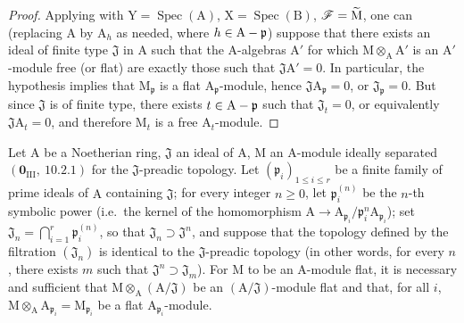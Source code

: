 \begin{proof}
Applying  with $\mathrm{Y}=\operatorname{Spec}(\mathrm{A})$, $\mathrm{X}=\operatorname{Spec}(\mathrm{B})$, $\mathscr{F}=\widetilde{\mathrm{M}}$, one can (replacing
$\mathrm{A}$ by $\mathrm{A}_h$ as needed, where $h\in\mathrm{A}-\mathfrak{p}$) suppose that there exists an ideal of finite type $\mathfrak{J}$ in $\mathrm{A}$
such that the $\mathrm{A}$-algebras $\mathrm{A}'$ for which $\mathrm{M}\otimes_\mathrm{A}\mathrm{A}'$ is an $\mathrm{A}'$-module free (or flat) are
exactly those such that $\mathfrak{J}\mathrm{A}'=0$. In particular, the hypothesis implies that $\mathrm{M}_\mathfrak{p}$ is a flat
$\mathrm{A}_\mathfrak{p}$-module, hence $\mathfrak{J}\mathrm{A}_\mathfrak{p}=0$, or $\mathfrak{J}_\mathfrak{p}=0$. But since $\mathfrak{J}$ is of finite type, there
exists $t\in\mathrm{A}-\mathfrak{p}$ such that $\mathfrak{J}_t=0$, or equivalently $\mathfrak{J}\mathrm{A}_t=0$, and therefore $\mathrm{M}_t$ is a free $\mathrm{A}_t$-module.
\end{proof}

\begin{proposition}[11.4.7]
\label{IV.11.4.7}
Let $\mathrm{A}$ be a Noetherian ring, $\mathfrak{J}$ an ideal of $\mathrm{A}$, $\mathrm{M}$ an $\mathrm{A}$-module
ideally separated $(\mathbf{0}_{\mathrm{III}},~10.2.1)$ for the $\mathfrak{J}$-preadic topology. Let $(\mathfrak{p}_i)_{1\leq i\leq r}$ be a finite family
of prime ideals of $\mathrm{A}$ containing $\mathfrak{J}$; for every integer $n\geq 0$, let $\mathfrak{p}_i^{(n)}$ be the $n$-th symbolic
power (i.e.\ the kernel of the homomorphism $\mathrm{A}\to\mathrm{A}_{\mathfrak{p}_i}/\mathfrak{p}_i^n\mathrm{A}_{\mathfrak{p}_i}$); set $\mathfrak{J}_n=\bigcap_{i=1}^{r}\mathfrak{p}_i^{(n)}$, so that $\mathfrak{J}_n\supset\mathfrak{J}^n$,
and suppose that the topology defined by the filtration $(\mathfrak{J}_n)$ is identical to the $\mathfrak{J}$-preadic topology
(in other words, for every $n$, there exists $m$ such that $\mathfrak{J}^n\supset\mathfrak{J}_m$). For $\mathrm{M}$ to be an $\mathrm{A}$-module flat,
it is necessary and sufficient that $\mathrm{M}\otimes_\mathrm{A}(\mathrm{A}/\mathfrak{J})$ be an $(\mathrm{A}/\mathfrak{J})$-module flat and that, for all $i$, $\mathrm{M}\otimes_\mathrm{A}\mathrm{A}_{\mathfrak{p}_i}=\mathrm{M}_{\mathfrak{p}_i}$
be a flat $\mathrm{A}_{\mathfrak{p}_i}$-module.
\end{proposition}

